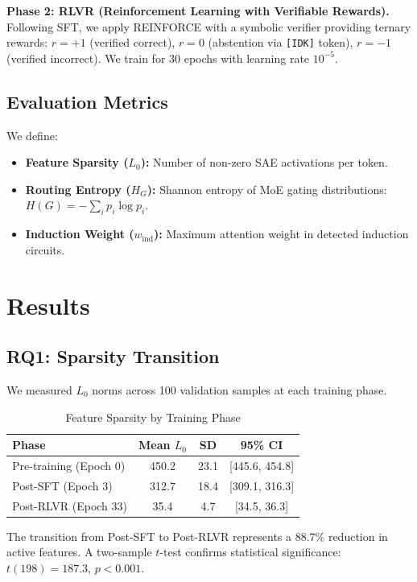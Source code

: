 \documentclass[12pt, a4paper]{article}
\begin{document}
\textbf{Phase 2: RLVR (Reinforcement Learning with Verifiable Rewards).} Following SFT, we apply REINFORCE with a symbolic verifier providing ternary rewards: $r=+1$ (verified correct), $r=0$ (abstention via \texttt{[IDK]} token), $r=-1$ (verified incorrect). We train for 30 epochs with learning rate $10^{-5}$.

\subsection{Evaluation Metrics}
We define:
\begin{itemize}
    \item \textbf{Feature Sparsity ($L_0$):} Number of non-zero SAE activations per token.
    \item \textbf{Routing Entropy ($H_G$):} Shannon entropy of MoE gating distributions: $H(G) = -\sum_i p_i \log p_i$.
    \item \textbf{Induction Weight ($w_{\mathrm{ind}}$):} Maximum attention weight in detected induction circuits.
\end{itemize}

\section{Results}

\subsection{RQ1: Sparsity Transition}
We measured $L_0$ norms across 100 validation samples at each training phase.

\begin{table}[h]
\centering
\caption{Feature Sparsity by Training Phase}
\label{tab:sparsity}
\begin{tabular}{@{}lccc@{}}
\toprule
\textbf{Phase} & \textbf{Mean $L_0$} & \textbf{SD} & \textbf{95\% CI} \\
\midrule
Pre-training (Epoch 0) & 450.2 & 23.1 & [445.6, 454.8] \\
Post-SFT (Epoch 3) & 312.7 & 18.4 & [309.1, 316.3] \\
Post-RLVR (Epoch 33) & 35.4 & 4.7 & [34.5, 36.3] \\
\bottomrule
\end{tabular}
\end{table}

The transition from Post-SFT to Post-RLVR represents a 88.7\% reduction in active features. A two-sample $t$-test confirms statistical significance: $t(198)=187.3$, $p<0.001$.
\end{document}
